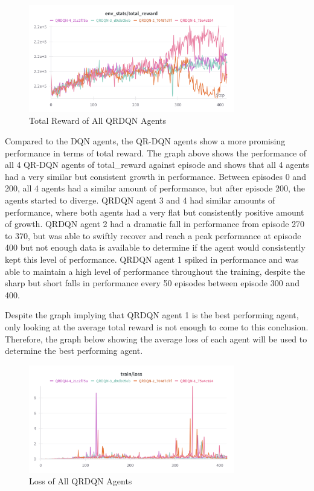\begin{figure}[H]
    \centering
    \includegraphics[width=0.8\textwidth]{figures/QRDQN_TotalReward.png}
    \caption{Total Reward of All QRDQN Agents}
    \label{fig:agent_eval_all_qrdqn}
\end{figure}

Compared to the DQN agents, the QR-DQN agents show a more promising performance in terms of total reward. The graph above shows the performance of all 4 QR-DQN agents of total\_reward against episode and shows that all 4 agents had a very similar but consistent growth in performance. Between episodes 0 and 200, all 4 agents had a similar amount of performance, but after episode 200, the agents started to diverge. QRDQN agent 3 and 4 had similar amounts of performance, where both agents had a very flat but consistently positive amount of growth. QRDQN agent 2 had a dramatic fall in performance from episode 270 to 370, but was able to swiftly recover and reach a peak performance at episode 400 but not enough data is available to determine if the agent would consistently kept this level of performance. QRDQN agent 1 spiked in performance and was able to maintain a high level of performance throughout the training, despite the sharp but short falls in performance every 50 episodes between episode 300 and 400. 

Despite the graph implying that QRDQN agent 1 is the best performing agent, only looking at the average total reward is not enough to come to this conclusion. Therefore, the graph below showing the average loss of each agent will be used to determine the best performing agent.

\begin{figure}[H]
    \centering
    \includegraphics[width=0.8\textwidth]{figures/QRDQN_Loss.png}
    \caption{Loss of All QRDQN Agents}
    \label{fig:agent_eval_all_qrdqn_loss}
\end{figure}

